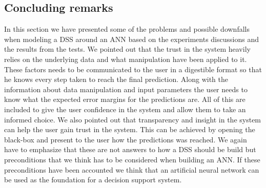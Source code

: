 \subsection{Concluding remarks}
In this section we have presented some of the problems and possible downfalls when modeling a DSS around an ANN based on the experiments discussions and the results from the tests. We pointed out that the trust in the system heavily relies on the underlying data and what manipulation have been applied to it. These factors needs to be communicated to the user in a digestible format so that he knows every step taken to reach the final prediction. Along with the information about data manipulation and input parameters the user needs to know what the expected error margins for the predictions are. All of this are included to give the user confidence in the system and allow them to take an informed choice. We also pointed out that transparency and insight in the system can help the user gain trust in the system. This can be achieved by opening the black-box and present to the user how the predictions was reached. We again have to emphasize that these are not answers to how a DSS should be build but preconditions that we think has to be considered when building an ANN. If these preconditions have been accounted we think that an artificial neural network can be used as the foundation for a decision support system.



